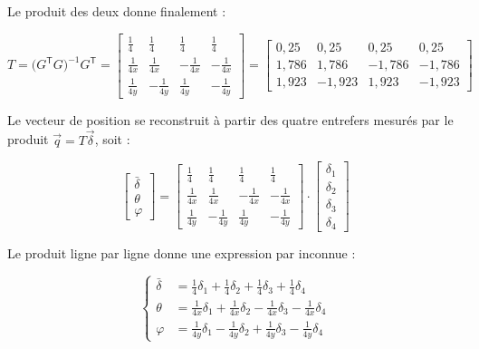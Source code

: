 Le produit des deux donne finalement :

\begin{equation}
    T = \bigl(G^{\mathsf T}G\bigr)^{-1} G^{\mathsf T}
    = \begin{bmatrix}
        \tfrac{1}{4}  & \tfrac{1}{4}   & \tfrac{1}{4}   & \tfrac{1}{4}   \\[4pt]
        \tfrac{1}{4x} & \tfrac{1}{4x}  & -\tfrac{1}{4x} & -\tfrac{1}{4x} \\[4pt]
        \tfrac{1}{4y} & -\tfrac{1}{4y} & \tfrac{1}{4y}  & -\tfrac{1}{4y}
    \end{bmatrix}
    = \begin{bmatrix}
        0{,}25  & 0{,}25   & 0{,}25   & 0{,}25   \\
        1{,}786 & 1{,}786  & -1{,}786 & -1{,}786 \\
        1{,}923 & -1{,}923 & 1{,}923  & -1{,}923
    \end{bmatrix}
\end{equation}

Le vecteur de position se reconstruit à partir des quatre entrefers
mesurés par le produit $\vec{q} = T\vec{\delta}$, soit :

\begin{equation}
    \begin{bmatrix} \bar\delta \\ \theta \\ \varphi \end{bmatrix}
    =
    \begin{bmatrix}
        \tfrac{1}{4}  & \tfrac{1}{4}   & \tfrac{1}{4}   & \tfrac{1}{4}   \\[4pt]
        \tfrac{1}{4x} & \tfrac{1}{4x}  & -\tfrac{1}{4x} & -\tfrac{1}{4x} \\[4pt]
        \tfrac{1}{4y} & -\tfrac{1}{4y} & \tfrac{1}{4y}  & -\tfrac{1}{4y}
    \end{bmatrix}
    \cdot
    \begin{bmatrix} \delta_1 \\ \delta_2 \\ \delta_3 \\ \delta_4 \end{bmatrix}
\end{equation}

Le produit ligne par ligne donne une expression par inconnue :

\begin{equation*}
    \left\{
    \begin{aligned}
        \bar\delta & = \tfrac{1}{4}\delta_1 + \tfrac{1}{4}\delta_2
        + \tfrac{1}{4}\delta_3 + \tfrac{1}{4}\delta_4                \\[4pt]
        \theta     & = \tfrac{1}{4x}\delta_1 + \tfrac{1}{4x}\delta_2
        - \tfrac{1}{4x}\delta_3 - \tfrac{1}{4x}\delta_4              \\[4pt]
        \varphi    & = \tfrac{1}{4y}\delta_1 - \tfrac{1}{4y}\delta_2
        + \tfrac{1}{4y}\delta_3 - \tfrac{1}{4y}\delta_4
    \end{aligned}
    \right.
\end{equation*}

